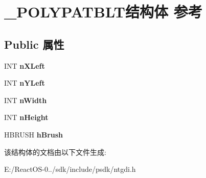 \hypertarget{struct___p_o_l_y_p_a_t_b_l_t}{}\section{\+\_\+\+P\+O\+L\+Y\+P\+A\+T\+B\+L\+T结构体 参考}
\label{struct___p_o_l_y_p_a_t_b_l_t}
\subsection*{Public 属性}
\begin{DoxyCompactItemize}
\item 
\mbox{\label{struct___p_o_l_y_p_a_t_b_l_t_a71cc1e7d01e7e514c67044cf250a3165}} 
I\+NT {\bfseries n\+X\+Left}
\item 
\mbox{\label{struct___p_o_l_y_p_a_t_b_l_t_a4fca684ea7e795203ba37cab97104b41}} 
I\+NT {\bfseries n\+Y\+Left}
\item 
\mbox{\label{struct___p_o_l_y_p_a_t_b_l_t_ae1d6af5657a391886a4ea88133ecaa05}} 
I\+NT {\bfseries n\+Width}
\item 
\mbox{\label{struct___p_o_l_y_p_a_t_b_l_t_a748f9e00e08b09dc3648b83a324c9b30}} 
I\+NT {\bfseries n\+Height}
\item 
\mbox{\label{struct___p_o_l_y_p_a_t_b_l_t_aa4559070823d0da4b605eb6b5f351c50}} 
H\+B\+R\+U\+SH {\bfseries h\+Brush}
\end{DoxyCompactItemize}


该结构体的文档由以下文件生成\+:\begin{DoxyCompactItemize}
\item 
E\+:/\+React\+O\+S-\/0../sdk/include/psdk/ntgdi.\+h\end{DoxyCompactItemize}
